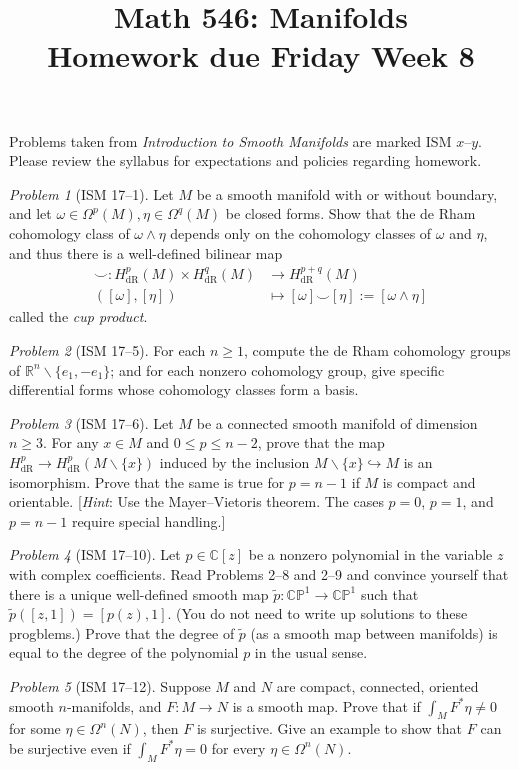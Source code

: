 \documentclass[11pt,twoside]{amsart}
\title{Math 546: Manifolds\\ Homework due Friday Week 8}
\theoremstyle{plain}
\theoremstyle{remark}
\newtheorem{prob}{Problem}
\theoremstyle{definition}
\theoremstyle{definition}
\newcommand{\RR}{\mathbb{R}}
\newcommand{\CC}{\mathbb{C}}
\newcommand{\PP}{\mathbb{P}}
\newcommand{\dR}{\mathrm{dR}}
\begin{document}
\maketitle

\noindent Problems taken from \emph{Introduction to Smooth Manifolds} are marked ISM $x$--$y$. Please review the syllabus for expectations and policies regarding homework.

\begin{prob}[ISM 17--1]
Let $M$ be a smooth manifold with or without boundary, and let $\omega\in\Omega^p(M),\eta\in\Omega^q(M)$ be closed forms. Show that the de Rham cohomology class of $\omega\wedge\eta$ depends only on the cohomology classes of $\omega$ and $\eta$, and thus there is a well-defined bilinear map
\[
\begin{aligned}
  \smile\colon H^p_{\dR}(M)\times H^q_{\dR}(M)&\longrightarrow H^{p+q}_{\dR}(M)\\
  ([\omega],[\eta])&\longmapsto [\omega]\smile[\eta]:=[\omega\wedge\eta]
\end{aligned}
\]
called the \emph{cup product}.
\end{prob}

\begin{prob}[ISM 17--5]
For each $n\ge 1$, compute the de Rham cohomology groups of $\RR^n\smallsetminus \{e_1,-e_1\}$; and for each nonzero cohomology group, give specific differential forms whose cohomology classes form a basis.
\end{prob}

\begin{prob}[ISM 17--6]
Let $M$ be a connected smooth manifold of dimension $n\ge 3$. For any $x\in M$ and $0\le p\le n-2$, prove that the map $H^p_{\dR}\to H^p_{\dR}(M\smallsetminus \{x\})$ induced by the inclusion $M\smallsetminus\{x\}\hookrightarrow M$ is an isomorphism. Prove that the same is true for $p=n-1$ if $M$ is compact and orientable. [\emph{Hint}: Use the Mayer--Vietoris theorem. The cases $p=0$, $p=1$, and $p=n-1$ require special handling.]
\end{prob}

\begin{prob}[ISM 17--10]
Let $p\in \CC[z]$ be a nonzero polynomial in the variable $z$ with complex coefficients. Read Problems 2--8 and 2--9 and convince yourself that there is a unique well-defined smooth map $\tilde p\colon \CC\PP^1\to\CC\PP^1$ such that $\tilde p([z,1]) = [p(z),1]$. (You do not need to write up solutions to these progblems.) Prove that the degree of $\tilde p$ (as a smooth map between manifolds) is equal to the degree of the polynomial $p$ in the usual sense.
\end{prob}

\begin{prob}[ISM 17--12]
Suppose $M$ and $N$ are compact, connected, oriented smooth $n$-manifolds, and $F\colon M\to N$ is a smooth map. Prove that if $\int_M F^*\eta\ne 0$ for some $\eta\in \Omega^n(N)$, then $F$ is surjective. Give an example to show that $F$ can be surjective even if $\int_M F^*\eta = 0$ for every $\eta\in \Omega^n(N)$.
\end{prob}
\end{document}

